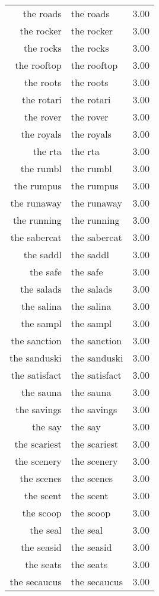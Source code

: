 \begin{table}[ht]
\begin{tabular}{rlr}
  the roads & the roads & 3.00 \\ 
  the rocker & the rocker & 3.00 \\ 
  the rocks & the rocks & 3.00 \\ 
  the rooftop & the rooftop & 3.00 \\ 
  the roots & the roots & 3.00 \\ 
  the rotari & the rotari & 3.00 \\ 
  the rover & the rover & 3.00 \\ 
  the royals & the royals & 3.00 \\ 
  the rta & the rta & 3.00 \\ 
  the rumbl & the rumbl & 3.00 \\ 
  the rumpus & the rumpus & 3.00 \\ 
  the runaway & the runaway & 3.00 \\ 
  the running & the running & 3.00 \\ 
  the sabercat & the sabercat & 3.00 \\ 
  the saddl & the saddl & 3.00 \\ 
  the safe & the safe & 3.00 \\ 
  the salads & the salads & 3.00 \\ 
  the salina & the salina & 3.00 \\ 
  the sampl & the sampl & 3.00 \\ 
  the sanction & the sanction & 3.00 \\ 
  the sanduski & the sanduski & 3.00 \\ 
  the satisfact & the satisfact & 3.00 \\ 
  the sauna & the sauna & 3.00 \\ 
  the savings & the savings & 3.00 \\ 
  the say & the say & 3.00 \\ 
  the scariest & the scariest & 3.00 \\ 
  the scenery & the scenery & 3.00 \\ 
  the scenes & the scenes & 3.00 \\ 
  the scent & the scent & 3.00 \\ 
  the scoop & the scoop & 3.00 \\ 
  the seal & the seal & 3.00 \\ 
  the seasid & the seasid & 3.00 \\ 
  the seats & the seats & 3.00 \\ 
  the secaucus & the secaucus & 3.00 \\ 

\end{tabular}
\end{table}
